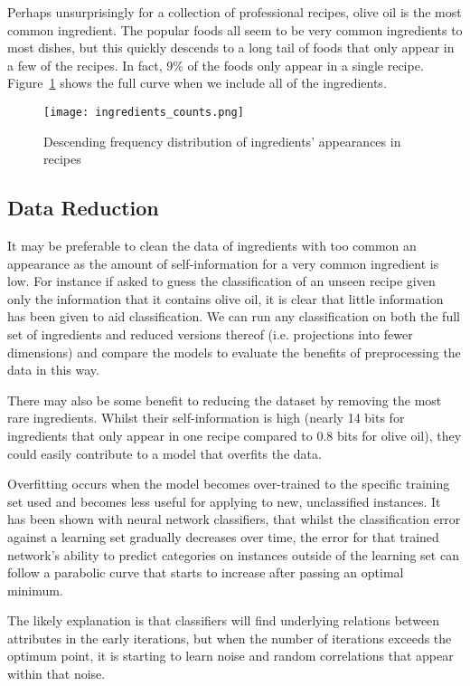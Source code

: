 \documentclass[11pt,a4paper]{article}
\begin{document}
Perhaps unsurprisingly for a collection of professional recipes, olive oil is the most
common ingredient. The popular foods all seem to be very common ingredients to most
dishes, but this quickly descends to a long tail of foods that only appear in a few
of the recipes. In fact, 9\% of the foods only appear in a single recipe.
Figure~\ref{ingredients-counts} shows the full curve when we include all of the
ingredients.

\begin{figure}[p]
  \texttt{[image: ingredients\_counts.png]}
  \caption{Descending frequency distribution of ingredients' appearances in recipes\label{ingredients-counts}}
\end{figure}

\subsection{Data Reduction}
\label{sec:data-reduction}
It may be preferable to clean the data of ingredients
with too common an appearance as the amount of
self-information \cite{reza1961introduction} for a very common ingredient is low. For
instance if asked to guess the classification of an unseen recipe given only
the information that it contains olive oil, it is clear that little information
has been given to aid classification. We can run any classification on
both the full set of ingredients
and reduced versions thereof (i.e. projections into fewer dimensions) and compare
the models to evaluate the benefits of preprocessing the data in this way.

There may also be some benefit to reducing the dataset by removing the most rare
ingredients. Whilst their self-information is high (nearly 14 bits for ingredients
that only appear in one recipe compared to 0.8 bits for olive oil), they could
easily contribute to a model that overfits the data.

Overfitting occurs when the model becomes over-trained to the specific training set
used and becomes less useful for applying to new, unclassified instances. It has
been shown \cite{tetko1995neural} with neural network classifiers, that whilst the
classification error against a learning set gradually decreases over time, the
error for that trained network's ability to predict categories on instances outside of the
learning set can follow a parabolic curve that starts to increase after passing an
optimal minimum.

The likely explanation \cite{tetko1995neural} is that classifiers will find underlying
relations between attributes in the early iterations, but when the number of iterations
exceeds the optimum point, it is starting to learn noise and random correlations that
appear within that noise.
\end{document}
